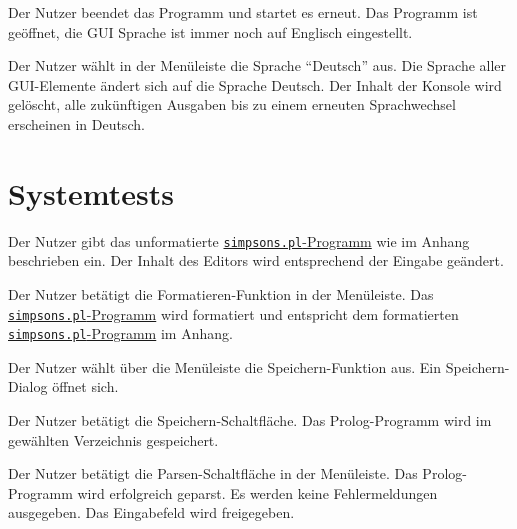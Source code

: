 \documentclass[parskip=full,11pt,twoside]{scrartcl}
\begin{document}
{Der Nutzer beendet das Programm und startet es erneut.}
{Das Programm ist geöffnet, die GUI Sprache ist immer noch auf Englisch eingestellt.}

{Der Nutzer wählt in der Menüleiste die Sprache \enquote{Deutsch} aus.}
{Die Sprache aller GUI-Elemente ändert sich auf die Sprache Deutsch. Der Inhalt der Konsole wird gelöscht, alle zukünftigen Ausgaben bis zu einem erneuten Sprachwechsel erscheinen in Deutsch.}

\section{Systemtests}


{Der Nutzer gibt das unformatierte \hyperref[appendix:simpsons]{\texttt{simpsons.pl}-Programm} wie im Anhang beschrieben ein.}
{Der Inhalt des Editors wird entsprechend der Eingabe geändert.}

{Der Nutzer betätigt die Formatieren-Funktion in der Menüleiste.}
{Das \hyperref[appendix:simpsons]{\texttt{simpsons.pl}-Programm} wird formatiert und entspricht dem formatierten \hyperref[appendix:simpsons]{\texttt{simpsons.pl}-Programm} im Anhang.}

{Der Nutzer wählt über die Menüleiste die Speichern-Funktion aus.}
{Ein Speichern-Dialog öffnet sich.}

{Der Nutzer betätigt die Speichern-Schaltfläche.}
{Das Prolog-Programm wird im gewählten Verzeichnis gespeichert.}

{Der Nutzer betätigt die Parsen-Schaltfläche in der Menüleiste.}
{Das Prolog-Programm wird erfolgreich geparst. Es werden keine Fehlermeldungen ausgegeben. Das Eingabefeld wird freigegeben.}
\end{document}
